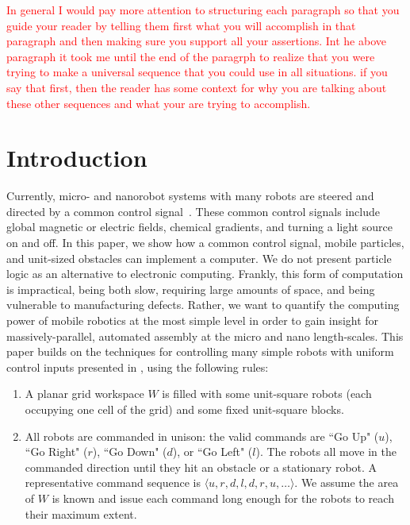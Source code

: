 \documentclass[letterpaper, 10 pt, conference]{ieeeconf}
\begin{document}
\textcolor{red}{In general I would pay more attention to structuring each paragraph so that you guide your reader by telling them first what you will accomplish in that paragraph and then making sure you support all your assertions. Int he above paragraph it took me until the end of the paragrph to realize that you were trying to make a universal sequence that you could use in all situations. if you say that first, then the reader has some context for why you are talking about these other sequences and what your are trying to accomplish. }

  \section{Introduction}
    
  
  Currently, micro- and nanorobot systems with many robots are steered and directed by a common control signal~\cite{Donald2013,Chiang2011,Hsi-Wen2012,Diller2013,Jing2013,Ou2013,Lanauze2013}. These common control signals include global magnetic or electric fields, chemical gradients, and turning a light source on and off.  In this paper, we show how a common control signal, mobile particles, and unit-sized obstacles can implement a computer.  
    We do not present particle logic as an alternative to electronic computing.
  Frankly, this form of computation is impractical, being both slow, requiring large amounts of space, and being vulnerable to manufacturing defects. Rather, we want to quantify the computing power of mobile robotics at the most simple level in order to gain insight for massively-parallel, automated assembly at the micro and nano length-scales.
  This paper builds on the techniques for controlling many simple robots with uniform control inputs presented in \cite{Becker2013f,Becker2014,Becker2014a}, using the following rules:
    \begin{enumerate}
\item A planar  grid workspace $W$ is filled with some unit-square robots (each occupying one cell of the grid)  and some fixed unit-square blocks.
\item All robots are commanded in unison: the valid commands are  ``Go Up" ($u$), ``Go Right" ($r$), ``Go Down" ($d$), or ``Go Left" ($l$).  The robots all move in the commanded direction until they hit an obstacle or a stationary robot.  A representative command sequence is $\langle u,r,d,l,d,r,u,\ldots\rangle$. We assume the area of $W$ is known and issue each command long enough for the robots to reach their maximum extent.
\end{enumerate}
  
\end{document}
